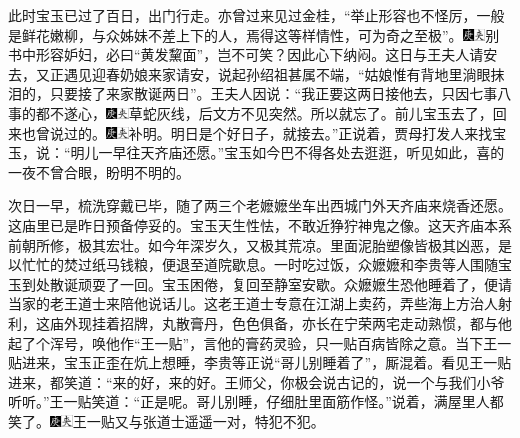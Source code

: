 此时宝玉已过了百日，出门行走。亦曾过来见过金桂，``举止形容也不怪厉，一般是鲜花嫩柳，与众姊妹不差上下的人，焉得这等样情性，可为奇之至极''。{\includegraphics[width=3mm]{../Images/00004}\includegraphics[width=3mm]{../Images/00012}\footnotesize \kaishu 别书中形容妒妇，必曰``黄发黧面''，岂不可笑？}因此心下纳闷。这日与王夫人请安去，又正遇见迎春奶娘来家请安，说起孙绍祖甚属不端，``姑娘惟有背地里淌眼抹泪的，只要接了来家散诞两日''。王夫人因说：``我正要这两日接他去，只因七事八事的都不遂心，{\includegraphics[width=3mm]{../Images/00004}\includegraphics[width=3mm]{../Images/00012}\footnotesize \kaishu 草蛇灰线，后文方不见突然。}所以就忘了。前儿宝玉去了，回来也曾说过的。{\includegraphics[width=3mm]{../Images/00004}\includegraphics[width=3mm]{../Images/00012}\footnotesize \kaishu 补明。}明日是个好日子，就接去。''正说着，贾母打发人来找宝玉，说：``明儿一早往天齐庙还愿。''宝玉如今巴不得各处去逛逛，听见如此，喜的一夜不曾合眼，盼明不明的。

次日一早，梳洗穿戴已毕，随了两三个老嬷嬷坐车出西城门外天齐庙来烧香还愿。这庙里已是昨日预备停妥的。宝玉天生性怯，不敢近狰狞神鬼之像。这天齐庙本系前朝所修，极其宏壮。如今年深岁久，又极其荒凉。里面泥胎塑像皆极其凶恶，是以忙忙的焚过纸马钱粮，便退至道院歇息。一时吃过饭，众嬷嬷和李贵等人围随宝玉到处散诞顽耍了一回。宝玉困倦，复回至静室安歇。众嬷嬷生恐他睡着了，便请当家的老王道士来陪他说话儿。这老王道士专意在江湖上卖药，弄些海上方治人射利，这庙外现挂着招牌，丸散膏丹，色色俱备，亦长在宁荣两宅走动熟惯，都与他起了个浑号，唤他作``王一贴''，言他的膏药灵验，只一贴百病皆除之意。当下王一贴进来，宝玉正歪在炕上想睡，李贵等正说``哥儿别睡着了''，厮混着。看见王一贴进来，都笑道：``来的好，来的好。王师父，你极会说古记的，说一个与我们小爷听听。''王一贴笑道：``正是呢。哥儿别睡，仔细肚里面筋作怪。''说着，满屋里人都笑了。{\includegraphics[width=3mm]{../Images/00004}\includegraphics[width=3mm]{../Images/00012}\footnotesize \kaishu 王一贴又与张道士遥遥一对，特犯不犯。}

